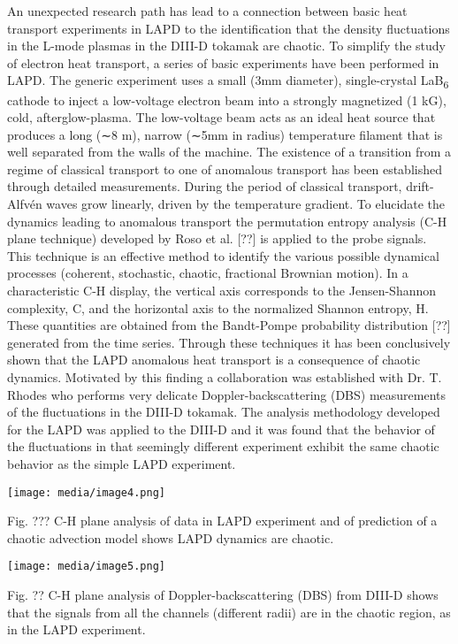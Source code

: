 \documentclass[11pt]{article}
\begin{document}
\begin{description}
An unexpected research path has lead to a connection between basic heat
transport experiments in LAPD to the identification that the density
fluctuations in the L-mode plasmas in the DIII-D tokamak are chaotic. To
simplify the study of electron heat transport, a series of basic
experiments have been performed in LAPD. The generic experiment uses a
small (3mm diameter), single-crystal LaB\textsubscript{6} cathode to
inject a low-voltage electron beam into a strongly magnetized (1 kG),
cold, afterglow-plasma. The low-voltage beam acts as an ideal heat
source that produces a long (∼8 m), narrow (∼5mm in radius) temperature
filament that is well separated from the walls of the machine. The
existence of a transition from a regime of classical transport to one of
anomalous transport has been established through detailed measurements.
During the period of classical transport, drift-Alfvén waves grow
linearly, driven by the temperature gradient. To elucidate the dynamics
leading to anomalous transport the permutation entropy analysis (C-H
plane technique) developed by Roso et al. {[}??{]} is applied to the
probe signals. This technique is an effective method to identify the
various possible dynamical processes (coherent, stochastic, chaotic,
fractional Brownian motion). In a characteristic C-H display, the
vertical axis corresponds to the Jensen-Shannon complexity, C, and the
horizontal axis to the normalized Shannon entropy, H. These quantities
are obtained from the Bandt-Pompe probability distribution {[}??{]}
generated from the time series. Through these techniques it has been
conclusively shown that the LAPD anomalous heat transport is a
consequence of chaotic dynamics. Motivated by this finding a
collaboration was established with Dr. T. Rhodes who performs very
delicate Doppler-backscattering (DBS) measurements of the fluctuations
in the DIII-D tokamak. The analysis methodology developed for the LAPD
was applied to the DIII-D and it was found that the behavior of the
fluctuations in that seemingly different experiment exhibit the same
chaotic behavior as the simple LAPD experiment.

\texttt{[image: media/image4.png]}

Fig. ??? C-H plane analysis of data in LAPD experiment and of prediction
of a chaotic advection model shows LAPD dynamics are chaotic.

\texttt{[image: media/image5.png]}

Fig. ?? C-H plane analysis of Doppler-backscattering (DBS) from DIII-D
shows that the signals from all the channels (different radii) are in
the chaotic region, as in the LAPD experiment.


\end{description}
\end{document}
